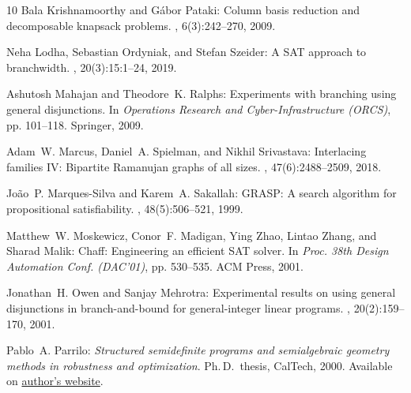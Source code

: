 \begin{thebibliography}{10}
{\sc Bala Krishnamoorthy and G{\'{a}}bor Pataki}: Column basis reduction and
  decomposable knapsack problems.
, 6(3):242--270, 2009.

{\sc Neha Lodha, Sebastian Ordyniak, and Stefan Szeider}: A {SAT} approach to
  branchwidth.
, 20(3):15:1--24, 2019.
\newblock [\epfmtdoi{10.1145/3326159}]

{\sc Ashutosh Mahajan and Theodore~K. Ralphs}: Experiments with branching using
  general disjunctions.
\newblock In {\em Operations Research and Cyber-Infrastructure (ORCS)}, pp.
  101--118. Springer, 2009.
\newblock [\epfmtdoi{10.1007/978-0-387-88843-9\_6}]

{\sc Adam~W. Marcus, Daniel~A. Spielman, and Nikhil Srivastava}: Interlacing
  families {IV:} {B}ipartite {R}amanujan graphs of all sizes.
, 47(6):2488--2509, 2018.
\newblock [\epfmtdoi{10.1137/16M106176X}]

{\sc Jo{\~{a}}o~P. Marques-Silva and Karem~A. Sakallah}: {GRASP:} {A} search
  algorithm for propositional satisfiability.
, 48(5):506--521, 1999.
\newblock [\epfmtdoi{10.1109/12.769433}]

{\sc Matthew~W. Moskewicz, Conor~F. Madigan, Ying Zhao, Lintao Zhang, and
  Sharad Malik}: Chaff: {E}ngineering an efficient {SAT} solver.
\newblock In {\em Proc. 38th Design Automation Conf. (DAC'01)}, pp. 530--535.
  ACM Press, 2001.
\newblock [\epfmtdoi{10.1145/378239.379017}]

{\sc Jonathan~H. Owen and Sanjay Mehrotra}: Experimental results on using
  general disjunctions in branch-and-bound for general-integer linear programs.
, 20(2):159--170, 2001.
\newblock [\epfmtdoi{10.1023/A:1011207119557}]

{\sc Pablo~A. Parrilo}: {\em Structured semidefinite programs and semialgebraic
  geometry methods in robustness and optimization}.
\newblock Ph.\,D.\ thesis, CalTech, 2000.
\newblock Available on
  \href{https://www.mit.edu/~parrilo/pubs/files/thesis.pdf}{author's website}.


\end{thebibliography}
